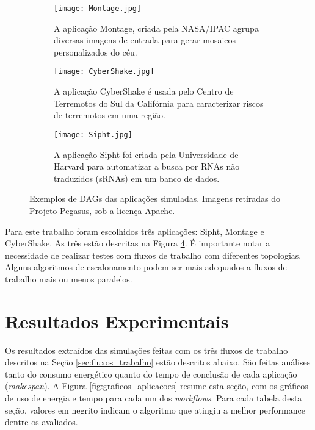 \begin{figure}
        \centering
        \begin{subfigure}[b]{0.5\textwidth}
                \texttt{[image: Montage.jpg]}
                \caption{A aplicação Montage, criada pela NASA/IPAC agrupa
                diversas imagens de entrada para gerar mosaicos personalizados
                do céu.}
                \label{fig:montage}
        \end{subfigure}%

        \begin{subfigure}[b]{0.5\textwidth}
                \texttt{[image: CyberShake.jpg]}
                \caption{A aplicação CyberShake é usada pelo Centro de Terremotos
                do Sul da Califórnia para caracterizar riscos de terremotos em uma
                região.}
                \label{fig:cybershake}
        \end{subfigure}
        
        \begin{subfigure}[b]{0.5\textwidth}
                \texttt{[image: Sipht.jpg]}
                \caption{A aplicação Sipht foi criada pela Universidade de
                Harvard para automatizar a busca por RNAs não traduzidos (sRNAs)
                em um banco de dados.}
                \label{fig:sipht}
        \end{subfigure}%
        \caption{Exemplos de DAGs das aplicações simuladas. Imagens retiradas
        do Projeto Pegasus, sob a licença Apache.}
        \label{fig:dags_aplicacoes}
\end{figure}


Para este trabalho foram escolhidos três aplicações: Sipht, Montage e CyberShake.
As três estão descritas na Figura \ref{fig:dags_aplicacoes}. É
importante notar a necessidade de realizar testes com fluxos de trabalho com
diferentes topologias. Alguns algoritmos de escalonamento podem ser mais
adequados a fluxos de trabalho mais ou menos paralelos.



\section{Resultados Experimentais}
\label{sec:resultados_experimentais}

Os resultados extraídos das simulações feitas com os três fluxos de trabalho
descritos na Seção \ref{sec:fluxos_trabalho} estão descritos abaixo. São feitas
análises tanto do consumo energético quanto do tempo de conclusão de cada
aplicação (\emph{makespan}). A Figura \ref{fig:graficos_aplicacoes} resume esta
seção, com os gráficos de uso de energia e tempo para cada um dos
\emph{workflows}. Para cada tabela desta seção, valores em negrito indicam o
algoritmo que atingiu a melhor performance dentre os avaliados.


